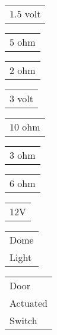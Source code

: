 \documentclass{book}
\begin{document}
\stopmpxshipout
\mpxshipout%
{\small \renewcommand{\arraystretch}{.9}
                \circuitfont\begin{tabular}{@{}l}
                   $1.5$ volt 
	        \end{tabular}}%
\stopmpxshipout
\mpxshipout%
{\small \renewcommand{\arraystretch}{.9}
                \circuitfont\begin{tabular}[t]{@{}c}
                   $5$ ohm 
	        \end{tabular}}%
\stopmpxshipout
\mpxshipout%
{\small \renewcommand{\arraystretch}{.9}
                \circuitfont\begin{tabular}{@{}l}
                   $2$ ohm 
	        \end{tabular}}%
\stopmpxshipout
\mpxshipout%
{\small \renewcommand{\arraystretch}{.9}
                \circuitfont\begin{tabular}{@{}r}
                   $3$ volt 
	        \end{tabular}}%
\stopmpxshipout
\mpxshipout%
{\small \renewcommand{\arraystretch}{.9}
                \circuitfont\begin{tabular}[b]{@{}c}
                   $10$ ohm 
	        \end{tabular}}%
\stopmpxshipout
\mpxshipout%
{\small \renewcommand{\arraystretch}{.9}
                \circuitfont\begin{tabular}[t]{@{}c}
                   $3$ ohm 
	        \end{tabular}}%
\stopmpxshipout
\mpxshipout%
{\small \renewcommand{\arraystretch}{.9}
                \circuitfont\begin{tabular}{@{}r}
                   $6$ ohm 
	        \end{tabular}}%
\stopmpxshipout
\mpxshipout%
{\small \renewcommand{\arraystretch}{.9}
                \circuitfont\begin{tabular}{@{}l}
                   12V \\
	        \end{tabular}}%
\stopmpxshipout
\mpxshipout%
{\small\renewcommand{\arraystretch}{.9}
                \circuitfont\begin{tabular}{@{}l}
                   Dome \\ Light
	        \end{tabular}}%
\stopmpxshipout
\mpxshipout%
{\small \renewcommand{\arraystretch}{.9}
                \circuitfont\begin{tabular}{@{}l}
                   Door \\ Actuated \\ Switch
	        \end{tabular}}%
\end{document}
